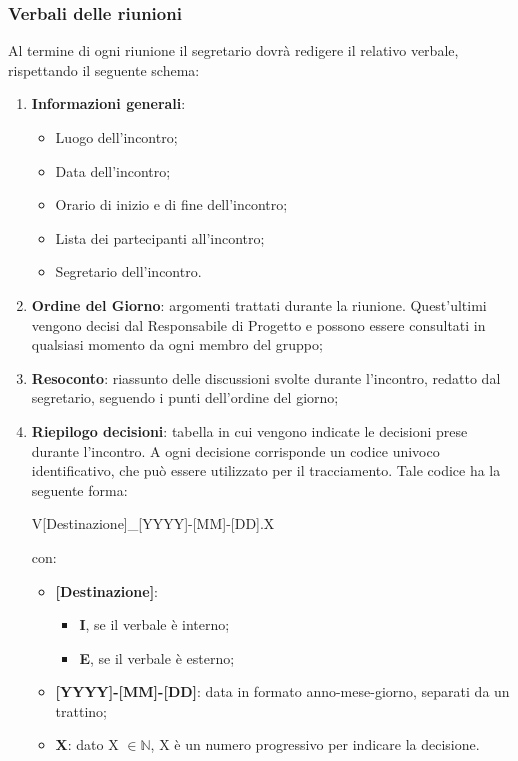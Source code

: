 \subsubsection{Verbali delle riunioni}
Al termine di ogni riunione il segretario dovrà redigere il relativo verbale, rispettando il seguente
schema:
\begin{enumerate}
	\item \textbf{Informazioni generali}:
		\begin{itemize}
			\item Luogo dell'incontro;
			\item Data dell'incontro;
			\item Orario di inizio e di fine dell'incontro;
			\item Lista dei partecipanti all'incontro;
			\item Segretario dell'incontro.
		\end{itemize}
	\item \textbf{Ordine del Giorno}: argomenti trattati durante la riunione. Quest’ultimi vengono decisi dal Responsabile di Progetto e possono essere consultati in qualsiasi momento da ogni membro del gruppo;
	\item \textbf{Resoconto}: riassunto delle discussioni svolte durante l'incontro, redatto dal segretario, seguendo i punti dell’ordine del giorno;
	\item \textbf{Riepilogo decisioni}: tabella in cui vengono indicate le decisioni prese durante l'incontro.
	A ogni decisione corrisponde un codice univoco identificativo, che può essere utilizzato per il tracciamento.
	Tale codice ha la seguente forma:
	\begin{center}
		V[Destinazione]\_[YYYY]-[MM]-[DD].X	
	\end{center}
	con:
	\begin{itemize}
		\item \textbf{[Destinazione]}:
		\begin{itemize}
			\item \textbf{I}, se il verbale è interno;
			\item \textbf{E}, se il verbale è esterno;
		\end{itemize}
		\item \textbf{[YYYY]-[MM]-[DD]}: data in formato anno-mese-giorno, separati da un trattino;
		\item \textbf{X}: dato X $\in \mathbb{N}$, X è un numero progressivo per indicare la decisione.
	\end{itemize}
\end{enumerate}

